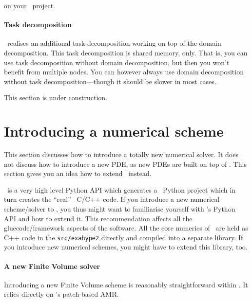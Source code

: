 \noindent
on your \ExaHyPE\ project. 


\paragraph{Task decomposition}
\ExaHyPE\ realises an additional task decomposition working on top of the domain
decomposition. 
This task decomposition is shared memory, only.
That is, you can use task decomposition without domain decomposition, but then
you won't benefit from multiple nodes.
You can however always use domain decomposition without task
decomposition---though it should be slower in most cases.

\begin{remark}
This section is under construction.
\end{remark} 


\section{Introducing a numerical scheme}

This section discusses how to introduce a totally new numerical solver. 
It does not discuss how to introduce a new PDE, as new PDEs are built on top of
\ExaHyPE.
This section gives you an idea how to extend \ExaHyPE\ instead.

\begin{remark}
  \ExaHyPE\ is a very high level Python API which generates a \Peano\
   Python project which in turn creates the ``real'' \Peano\ C/C++ code. If you
   introduce a new numerical scheme/solver to \ExaHyPE, you thus might want to
   familiarise yourself with \Peano's Python API and how to extend it. This
   recommendation affects all the gluecode/framework aspects of the software.
   All the core numerics of \ExaHyPE\ are held as C++ code in the
   \texttt{src/exahype2} directly and compiled into a separate library. If you
   introduce new numerical schemes, you might have to extend this library, too.
\end{remark}


\paragraph{A new Finite Volume solver}

Introducing a new Finite Volume scheme is reasonably straightforward within
\ExaHyPE.
It relies directly on \Peano's patch-based AMR.


